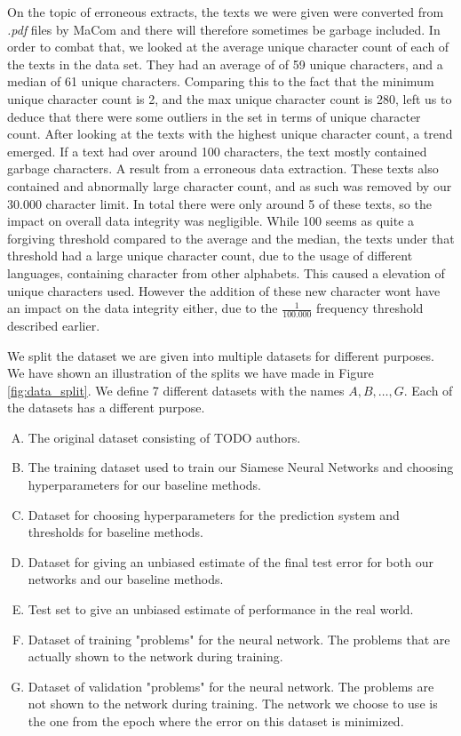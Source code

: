 On the topic of erroneous extracts, the texts we were given were converted from
\textit{.pdf} files by MaCom and there will therefore sometimes be garbage
included. In order to combat that, we looked at the average unique character
count of each of the texts in the data set. They had an average of of 59 unique
characters, and a median of 61 unique characters. Comparing this to the fact
that the minimum unique character count is 2, and the max unique character count
is 280, left us to deduce that there were some outliers in the set in terms of
unique character count. After looking at the texts with the highest unique
character count, a trend emerged. If a text had over around 100 characters,
the text mostly contained garbage characters. A result from a erroneous data
extraction. These texts also contained and abnormally large character count,
and as such was removed by our 30.000 character limit. In total there were only
around 5 of these texts, so the impact on overall data integrity was negligible.
While 100 seems as quite a forgiving threshold compared to the average and the
median, the texts under that threshold had a large unique character count, due
to the usage of different languages, containing character from other alphabets.
This caused a elevation of unique characters used. However the addition of these
new character wont have an impact on the data integrity either, due to the
$\frac{1}{100.000}$ frequency threshold described earlier.


We split the dataset we are given into multiple datasets for different purposes.
We have shown an illustration of the splits we have made in Figure
\ref{fig:data_split}. We define 7 different datasets with the names $A, B,
\dots, G$. Each of the datasets has a different purpose.

\begin{enumerate}[A)]
    \item The original dataset consisting of TODO authors.
    \item The training dataset used to train our Siamese Neural Networks and
        choosing hyperparameters for our baseline methods.
    \item Dataset for choosing hyperparameters for the prediction system and
        thresholds for baseline methods.
    \item Dataset for giving an unbiased estimate of the final test error for
        both our networks and our baseline methods.
    \item Test set to give an unbiased estimate of performance in the real
        world.
    \item Dataset of training "problems" for the neural network. The problems
        that are actually shown to the network during training.
    \item Dataset of validation "problems" for the neural network. The problems
        are not shown to the network during training. The network we choose to
        use is the one from the epoch where the error on this dataset is
        minimized.
\end{enumerate}

